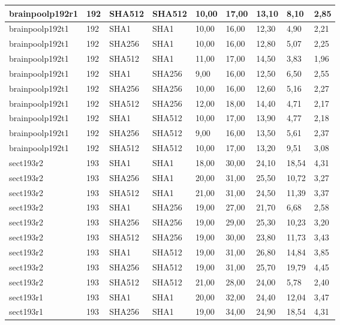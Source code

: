 \begin{longtable}{| l | l | l | l | l |l |l |l |l |}
brainpoolp192r1 & 192 & SHA512 & SHA512 & 10,00 & 17,00 & 13,10 & 8,10 & 2,85 \\ \hline 
brainpoolp192t1 & 192 & SHA1 & SHA1 & 10,00 & 16,00 & 12,30 & 4,90 & 2,21 \\ \hline 
brainpoolp192t1 & 192 & SHA256 & SHA1 & 10,00 & 16,00 & 12,80 & 5,07 & 2,25 \\ \hline 
brainpoolp192t1 & 192 & SHA512 & SHA1 & 11,00 & 17,00 & 14,50 & 3,83 & 1,96 \\ \hline 
brainpoolp192t1 & 192 & SHA1 & SHA256 & 9,00 & 16,00 & 12,50 & 6,50 & 2,55 \\ \hline 
brainpoolp192t1 & 192 & SHA256 & SHA256 & 10,00 & 16,00 & 12,60 & 5,16 & 2,27 \\ \hline 
brainpoolp192t1 & 192 & SHA512 & SHA256 & 12,00 & 18,00 & 14,40 & 4,71 & 2,17 \\ \hline 
brainpoolp192t1 & 192 & SHA1 & SHA512 & 10,00 & 17,00 & 13,90 & 4,77 & 2,18 \\ \hline 
brainpoolp192t1 & 192 & SHA256 & SHA512 & 9,00 & 16,00 & 13,50 & 5,61 & 2,37 \\ \hline 
brainpoolp192t1 & 192 & SHA512 & SHA512 & 10,00 & 17,00 & 13,20 & 9,51 & 3,08 \\ \hline 
sect193r2 & 193 & SHA1 & SHA1 & 18,00 & 30,00 & 24,10 & 18,54 & 4,31 \\ \hline 
sect193r2 & 193 & SHA256 & SHA1 & 20,00 & 31,00 & 25,50 & 10,72 & 3,27 \\ \hline 
sect193r2 & 193 & SHA512 & SHA1 & 21,00 & 31,00 & 24,50 & 11,39 & 3,37 \\ \hline 
sect193r2 & 193 & SHA1 & SHA256 & 19,00 & 27,00 & 21,70 & 6,68 & 2,58 \\ \hline 
sect193r2 & 193 & SHA256 & SHA256 & 19,00 & 29,00 & 25,30 & 10,23 & 3,20 \\ \hline 
sect193r2 & 193 & SHA512 & SHA256 & 19,00 & 30,00 & 23,80 & 11,73 & 3,43 \\ \hline 
sect193r2 & 193 & SHA1 & SHA512 & 19,00 & 31,00 & 26,80 & 14,84 & 3,85 \\ \hline 
sect193r2 & 193 & SHA256 & SHA512 & 19,00 & 31,00 & 25,70 & 19,79 & 4,45 \\ \hline 
sect193r2 & 193 & SHA512 & SHA512 & 21,00 & 28,00 & 24,00 & 5,78 & 2,40 \\ \hline 
sect193r1 & 193 & SHA1 & SHA1 & 20,00 & 32,00 & 24,40 & 12,04 & 3,47 \\ \hline 
sect193r1 & 193 & SHA256 & SHA1 & 19,00 & 34,00 & 24,90 & 18,54 & 4,31 \\ \hline 

\end{longtable}
